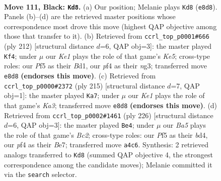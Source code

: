 \documentclass[11pt]{article}
\begin{document}
\clearpage

\begin{figure}[p]\centering
\begin{subfigure}{0.46\textwidth}\centering
\resizebox{\linewidth}{!}{%
\newchessgame
\chessboard[
  setfen={4k1K1/8/8/5p2/b4P2/8/8/8 b - - 37 111},
  showmover=false,
  pgfstyle=straightmove, color=movearrow, markmove={e8-d8}
]}
\caption{}
\end{subfigure}\hfill
\begin{subfigure}{0.46\textwidth}\centering
\resizebox{\linewidth}{!}{%
\newchessgame
\chessboard[
  setfen={7B/4k3/8/4K3/8/6n1/8/3B4 w - - 11 107},
  showmover=false,
  pgfstyle=straightmove, color=movearrow, markmove={e5-f4}
]}
\caption{}
\end{subfigure}
\\[4pt]
\begin{subfigure}{0.46\textwidth}\centering
\resizebox{\linewidth}{!}{%
\newchessgame
\chessboard[
  setfen={8/6b1/k7/8/2K5/p4N2/P7/8 b - - 73 108},
  showmover=false,
  pgfstyle=straightmove, color=movearrow, markmove={a6-a7}
]}
\caption{}
\end{subfigure}\hfill
\begin{subfigure}{0.46\textwidth}\centering
\resizebox{\linewidth}{!}{%
\newchessgame
\chessboard[
  setfen={6k1/4B3/6K1/8/2pb4/8/2B5/8 w - - 2 114},
  showmover=false,
  pgfstyle=straightmove, color=movearrow, markmove={c2-e4}
]}
\caption{}
\end{subfigure}
\caption{\textbf{Move 111, Black: \texttt{Kd8}.} (a) Our position; Melanie plays \texttt{Kd8} (\texttt{e8d8}). Panels (b)--(d) are the retrieved master positions whose correspondence most drove this move (highest QAP objective among those that transfer to it). (b) Retrieved from \texttt{ccrl\_top\_p0001\#666} (ply 212) [structural distance $d$=6, QAP obj=3]: the master played \texttt{Kf4}; under $\mu$ our \emph{Ke1} plays the role of that game's \emph{Ke5}; cross-type roles: our \emph{P}f5 as their \emph{B}d1, our \emph{p}f4 as their \emph{n}g3; transferred move \texttt{e8d8} \textbf{(endorses this move)}. (c) Retrieved from \texttt{ccrl\_top\_p0000\#2372} (ply 215) [structural distance $d$=7, QAP obj=1]: the master played \texttt{Ka7}; under $\mu$ our \emph{Ke1} plays the role of that game's \emph{Ka3}; transferred move \texttt{e8d8} \textbf{(endorses this move)}. (d) Retrieved from \texttt{ccrl\_top\_p0002\#1461} (ply 226) [structural distance $d$=6, QAP obj=3]: the master played \texttt{Be4}; under $\mu$ our \emph{Ba5} plays the role of that game's \emph{Bc2}; cross-type roles: our \emph{P}f5 as their \emph{b}d4, our \emph{p}f4 as their \emph{B}e7; transferred move \texttt{a4c6}. Synthesis: 2 retrieved analogs transferred to \texttt{Kd8} (summed QAP objective 4, the strongest correspondence among the candidate moves); Melanie committed it via the \texttt{search} selector.}
\label{fig:thought-m221}
\end{figure}
\end{document}
